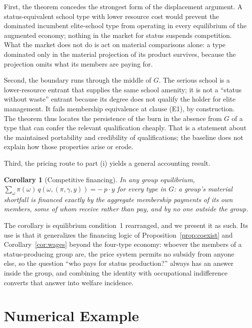 \documentclass[12pt,letterpaper]{article}
\newtheorem{corollary}{Corollary}
\theoremstyle{definition}
\begin{document}
First, the theorem concedes the strongest form of the displacement argument.
A status-equivalent school type with lower resource cost would prevent the dominated incumbent elite-school type from operating in every equilibrium of the augmented economy; nothing in the market for status suspends competition.
What the market does not do is act on material comparisons alone: a type dominated only in the material projection of its product survives, because the projection omits what its members are paying for.

Second, the boundary runs through the middle of $G$.
The serious school is a lower-resource entrant that supplies the same school amenity; it is not a ``status without waste'' entrant because its degree does not qualify the holder for elite management.
It fails membership equivalence at clause (E1), by construction.
The theorem thus locates the persistence of the burn in the absence from $G$ of a type that can confer the relevant qualification cheaply.
That is a statement about the maintained portability and credibility of qualifications; the baseline does not explain how those properties arise or erode.

Third, the pricing route to part (i) yields a general accounting result.

\begin{corollary}[Competitive financing]\label{cor:financing}
In any group equilibrium, $\sum_{\omega}\pi(\omega)\,q(\omega,(\pi,\gamma,y)) = -\,p\cdot y$ for every type in $G$: a group's material shortfall is financed exactly by the aggregate membership payments of its own members, some of whom receive rather than pay, and by no one outside the group.
\end{corollary}

The corollary is equilibrium condition~1 rearranged, and we present it as such.
Its use is that it generalizes the financing logic of Proposition~\ref{prop:coexist} and Corollary~\ref{cor:wages} beyond the four-type economy: whoever the members of a status-producing group are, the price system permits no subsidy from anyone else, so the question ``who pays for status production?'' always has an answer inside the group, and combining the identity with occupational indifference converts that answer into welfare incidence.

\section{Numerical Example}\label{sec:example}
\end{document}
